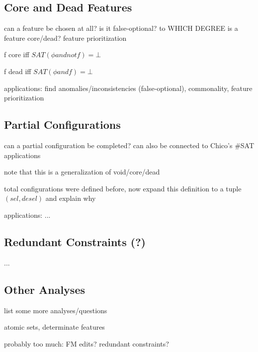 \subsection{Core and Dead Features} %
\begin{frame}{\myframetitle}
	can a feature be chosen at all? is it false-optional?
	to WHICH DEGREE is a feature core/dead? feature prioritization

	f core iff $SAT(\phi and not f) = \bot$
	
	f dead iff $SAT(\phi and f) = \bot$

	applications: find anomalies/inconsistencies (false-optional), commonality, feature prioritization
\end{frame}

\subsection{Partial Configurations}
\begin{frame}{\myframetitle}
	can a partial configuration be completed?
	can also be connected to Chico's \#SAT applications

	note that this is a generalization of void/core/dead

	total configurations were defined before, now expand this definition to a tuple $(sel, desel)$ and explain why

	applications: ...
\end{frame}

\subsection{Redundant Constraints (?)}
\begin{frame}{\myframetitle}
	... %
\end{frame}

\subsection{Other Analyses}
\begin{frame}{\myframetitle}
	list some more analyses/questions

	atomic sets, determinate features

	probably too much:
	FM edits?
	redundant constraints?

\end{frame}

